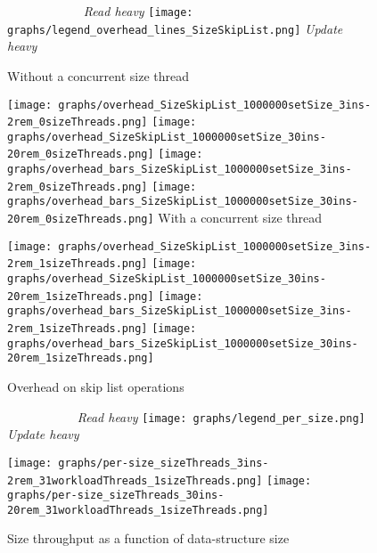 \documentclass{article}
\begin{document}
\begin{figure*}[ht]
  \caption{Overhead on skip list operations}
  \centering
  \medskip
  \textit{\ \ \ \ \ \ \ \ \ \ \ \ Read heavy}\hfill
  \texttt{[image: graphs/legend\_overhead\_lines\_SizeSkipList.png]}\hfill
  \textit{Update heavy\ \ \ \ }\par
  \medskip
  Without a concurrent size thread\par
  \texttt{[image: graphs/overhead\_SizeSkipList\_1000000setSize\_3ins-2rem\_0sizeThreads.png]}\hspace*{1.5mm}
  \texttt{[image: graphs/overhead\_SizeSkipList\_1000000setSize\_30ins-20rem\_0sizeThreads.png]}
  {\texttt{[image: graphs/overhead\_bars\_SizeSkipList\_1000000setSize\_3ins-2rem\_0sizeThreads.png]}}\hspace*{0.5mm}
  \texttt{[image: graphs/overhead\_bars\_SizeSkipList\_1000000setSize\_30ins-20rem\_0sizeThreads.png]}
  \medskip
  With a concurrent size thread\par
  \texttt{[image: graphs/overhead\_SizeSkipList\_1000000setSize\_3ins-2rem\_1sizeThreads.png]}\hspace*{1mm}
  \texttt{[image: graphs/overhead\_SizeSkipList\_1000000setSize\_30ins-20rem\_1sizeThreads.png]}
  {\texttt{[image: graphs/overhead\_bars\_SizeSkipList\_1000000setSize\_3ins-2rem\_1sizeThreads.png]}}\hspace*{.05mm}
  \texttt{[image: graphs/overhead\_bars\_SizeSkipList\_1000000setSize\_30ins-20rem\_1sizeThreads.png]}
  \label{fig:SL overhead}
\end{figure*}

\begin{figure*}[ht]
  \caption{Size throughput as a function of data-structure size}
  \centering
  \medskip
  \textit{\ \ \ \ \ \ \ \ \ \ \ Read heavy}\hfill
  \texttt{[image: graphs/legend\_per\_size.png]}\hfill
  \textit{Update heavy\ \ \ }\par
  \medskip
  \texttt{[image: graphs/per-size\_sizeThreads\_3ins-2rem\_31workloadThreads\_1sizeThreads.png]}\hfill
  \texttt{[image: graphs/per-size\_sizeThreads\_30ins-20rem\_31workloadThreads\_1sizeThreads.png]}\par
  \label{fig:per-size}
\end{figure*}
\end{document}
